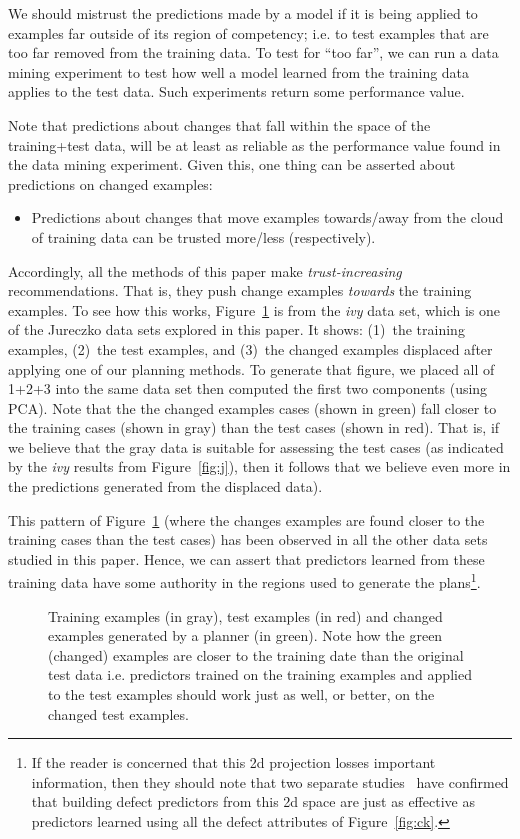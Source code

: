 \documentclass{sig-alternate}
\newcommand{\bi}{\begin{itemize}}
\newcommand{\ei}{\end{itemize}}
\newcommand{\fig}[1]{Figure~\ref{fig:#1}}
\begin{document}
We should mistrust the predictions made by a  model   if it is being applied to examples far outside of its region of competency;
i.e. to test examples that are too far removed from the training data.   
To test for ``too far'', we can run a data mining experiment to test how well
a model learned from the training data applies to the test data. Such experiments return some performance value.

Note that predictions  about changes that  fall within the space of the training+test data, will be at least
as reliable as the performance value found in the data mining experiment.
Given this, one thing  can be asserted about predictions on changed examples:
\bi
\item Predictions about changes that move examples towards/away from the cloud of training data can be trusted more/less (respectively).
\ei  
Accordingly, all the methods of this paper make {\em trust-increasing} recommendations. That is, they push change examples {\em towards} the
training examples.  To see how this works, 
 \fig{howxy} is from the {\em ivy} data
set, which is one of the Jureczko data sets explored in this paper. It shows: (1)~the training examples, (2)~the test examples, and (3)~the
changed  examples displaced after applying one of our planning methods.
To generate that figure, we placed all of 1+2+3 into the same data set then computed the first
two  components (using PCA). Note that the  the   changed examples
cases  (shown in green)  fall closer to the training cases (shown in gray) than
the test cases (shown in red).  That is, if we believe
that the gray data is  suitable for assessing
the test cases (as indicated by the {\em ivy} results from \fig{j}), then it follows
that we believe even more in the predictions
generated from the displaced data).

This pattern of \fig{howxy} (where the changes examples are found closer to  the training cases than the test cases) has been observed in all the other data sets studied in this
paper. Hence,  we can assert that
predictors learned from these training data have some authority in the regions
used to generate the plans\footnote{If the reader is concerned that this 2d projection
losses important information, then they should note that two separate  studies~\cite{papa13,divya15}
have confirmed that building defect predictors from this 2d space are just as effective
as predictors learned using all the defect attributes of \fig{ck}.}. 


\begin{figure}
\caption{Training examples (in gray), test examples (in red) and 
changed examples generated by a planner (in green). Note how the green (changed) examples are closer to the  training
date than the original test data
i.e. predictors trained on the training examples and
applied to the test examples should
work just as well, or better, on the changed test examples.}\label{fig:howxy}
\end{figure}
\end{document}
